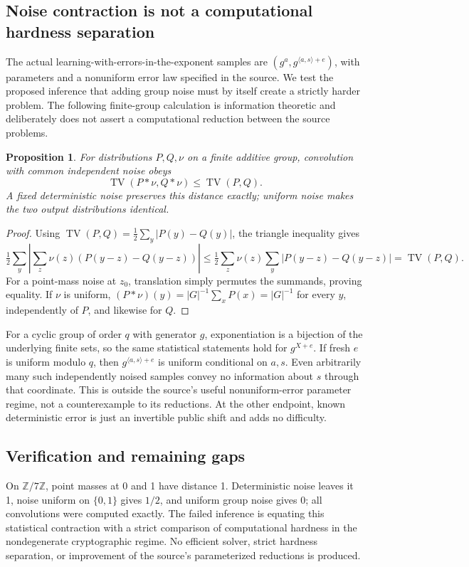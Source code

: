 \documentclass[11pt]{article}
\newtheorem{proposition}{Proposition}
\begin{document}
\subsection{Noise contraction is not a computational hardness separation}
The actual learning-with-errors-in-the-exponent samples are $(g^a,g^{\langle a,s\rangle+e})$, with parameters and a nonuniform error law specified in the source. We test the proposed inference that adding group noise must by itself create a strictly harder problem. The following finite-group calculation is information theoretic and deliberately does not assert a computational reduction between the source problems.
\begin{proposition}
For distributions $P,Q,\nu$ on a finite additive group, convolution with common independent noise obeys
\[
\operatorname{TV}(P*\nu,Q*\nu)\le\operatorname{TV}(P,Q).
\]
A fixed deterministic noise preserves this distance exactly; uniform noise makes the two output distributions identical.
\end{proposition}
\begin{proof}
Using $\operatorname{TV}(P,Q)=\tfrac12\sum_y|P(y)-Q(y)|$, the triangle inequality gives
\[
\tfrac12\sum_y\left|\sum_z\nu(z)(P(y-z)-Q(y-z))\right|
\le\tfrac12\sum_z\nu(z)\sum_y|P(y-z)-Q(y-z)|
=\operatorname{TV}(P,Q).
\]
For a point-mass noise at $z_0$, translation simply permutes the summands, proving equality. If $\nu$ is uniform, $(P*\nu)(y)=|G|^{-1}\sum_xP(x)=|G|^{-1}$ for every $y$, independently of $P$, and likewise for $Q$.
\end{proof}
For a cyclic group of order $q$ with generator $g$, exponentiation is a bijection of the underlying finite sets, so the same statistical statements hold for $g^{X+e}$. If fresh $e$ is uniform modulo $q$, then $g^{\langle a,s\rangle+e}$ is uniform conditional on $a,s$. Even arbitrarily many such independently noised samples convey no information about $s$ through that coordinate. This is outside the source's useful nonuniform-error parameter regime, not a counterexample to its reductions. At the other endpoint, known deterministic error is just an invertible public shift and adds no difficulty.
\subsection{Verification and remaining gaps}
On $\mathbb Z/7\mathbb Z$, point masses at 0 and 1 have distance 1. Deterministic noise leaves it 1, noise uniform on $\{0,1\}$ gives $1/2$, and uniform group noise gives 0; all convolutions were computed exactly. The failed inference is equating this statistical contraction with a strict comparison of computational hardness in the nondegenerate cryptographic regime. No efficient solver, strict hardness separation, or improvement of the source's parameterized reductions is produced.
\end{document}
